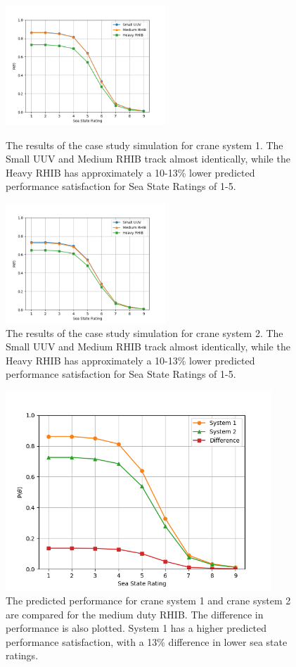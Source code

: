 \documentclass{svproc}
\begin{document}
\begin{figure}[hbt]
	\centering
	\begin{minipage}[b]{0.45\textwidth}
        \includegraphics[width=6cm]{case_study_1.png}
        \caption{The results of the case study simulation for crane system 1. The Small UUV and Medium RHIB track almost identically, while the Heavy RHIB has approximately a 10-13\% lower predicted performance satisfaction for Sea State Ratings of 1-5.}
        \label{fig:case1}
	\end{minipage}
	\hfill
	\begin{minipage}[b]{0.45\textwidth}
        \includegraphics[width=6cm]{case_study_2.png}
        \caption{The results of the case study simulation for crane system 2. The Small UUV and Medium RHIB track almost identically, while the Heavy RHIB has approximately a 10-13\% lower predicted performance satisfaction for Sea State Ratings of 1-5.}
        \label{fig:case2}
	\end{minipage}
\end{figure}

\begin{figure}[htb]
\begin{adjustwidth}{-0.5cm}{-.5cm} 
\centering
\includegraphics[width=10cm]{case_study_6.png}
\caption{The predicted performance for crane system 1 and crane system 2 are compared for the medium duty RHIB. The difference in performance is also plotted. System 1 has a higher predicted performance satisfaction, with a 13\% difference in lower sea state ratings.}
\label{fig:case_comp}
\end{adjustwidth} 
\end{figure}
\end{document}
